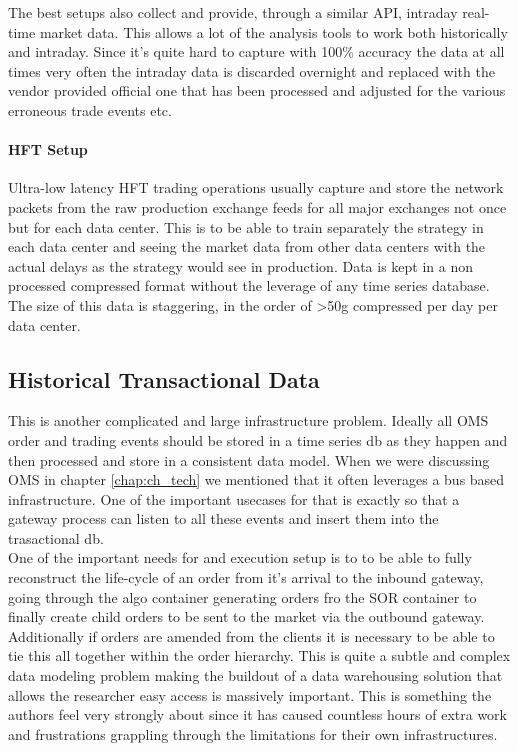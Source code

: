 The best setups also collect and provide, through a similar API, intraday real-time market data. This allows a lot of the analysis tools to work both historically and intraday. Since it's quite hard to capture with 100\% accuracy the data at all times very often the intraday data is discarded overnight and replaced with the vendor provided official one that has been processed and adjusted for the various erroneous trade events etc. 

\paragraph{HFT Setup}

Ultra-low latency HFT trading operations usually capture and store the network packets from the raw production exchange feeds for all major exchanges not once but for each data center. This is to be able to train separately the strategy in each data center and seeing the market data from other data centers with the actual delays as the strategy would see in production. Data is kept in a non processed compressed format without the leverage of any time series database. The size of this data is staggering, in the order of >50g compressed per day per data center.

\subsection{Historical Transactional Data}
This is another complicated and large infrastructure problem. Ideally all OMS order and trading events should be stored in a time series db as they happen and then processed and store in a consistent data model. When we were discussing OMS in chapter \ref{chap:ch_tech} we mentioned that it often leverages a bus based infrastructure. One of the important usecases for that is exactly so that a gateway process can listen to all these events and insert them into the trasactional db. \\

One of the important needs for and execution setup is to to be able to fully reconstruct the life-cycle of an order from it's arrival to the inbound gateway, going through the algo container generating orders fro the SOR container to finally create child orders to be sent to the market via the outbound gateway. Additionally if orders are amended from the clients it is necessary to be able to tie this all together within the order hierarchy. This is quite a subtle and complex data modeling problem making the buildout of a data warehousing solution that allows the researcher easy access is massively important. This is something the authors feel very strongly about since it has caused countless hours of extra work and frustrations grappling through the limitations for their own infrastructures.\\

